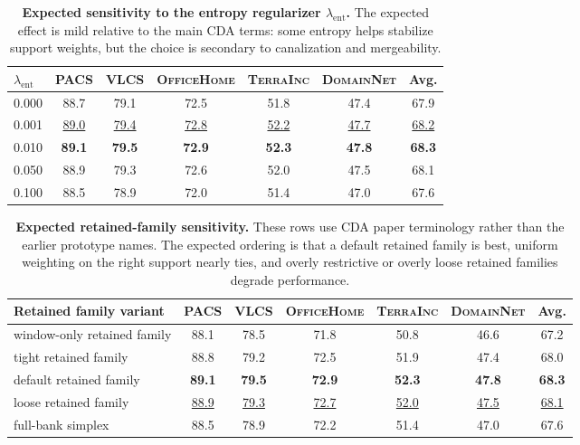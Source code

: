 \documentclass[10pt]{article}
\newcommand{\data}[1]{\textsc{#1}}
\newcommand{\Expected}[1]{#1}
\newcommand{\Best}[1]{\textbf{\Expected{#1}}}
\newcommand{\Second}[1]{\underline{\Expected{#1}}}
\begin{document}
\begin{table}[H]
\centering
\small
\caption{\textbf{Expected sensitivity to the entropy regularizer \(\lambda_{\mathrm{ent}}\).} The expected effect is mild relative to the main CDA terms: some entropy helps stabilize support weights, but the choice is secondary to canalization and mergeability.}
\label{tab:cda_lambda_ent_expected}
\setlength{\tabcolsep}{5pt}
\begin{tabular}{lccccc|c}
\toprule
\(\lambda_{\mathrm{ent}}\) & \data{PACS} & \data{VLCS} & \data{OfficeHome} & \data{TerraInc} & \data{DomainNet} & \textbf{Avg.} \\
\midrule
\Expected{0.000} & \Expected{88.7} & \Expected{79.1} & \Expected{72.5} & \Expected{51.8} & \Expected{47.4} & \Expected{67.9} \\
\Expected{0.001} & \Second{89.0} & \Second{79.4} & \Second{72.8} & \Second{52.2} & \Second{47.7} & \Second{68.2} \\
\Expected{0.010} & \Best{89.1} & \Best{79.5} & \Best{72.9} & \Best{52.3} & \Best{47.8} & \Best{68.3} \\
\Expected{0.050} & \Expected{88.9} & \Expected{79.3} & \Expected{72.6} & \Expected{52.0} & \Expected{47.5} & \Expected{68.1} \\
\Expected{0.100} & \Expected{88.5} & \Expected{78.9} & \Expected{72.0} & \Expected{51.4} & \Expected{47.0} & \Expected{67.6} \\
\bottomrule
\end{tabular}
\end{table}

\begin{table}[H]
\centering
\small
\caption{\textbf{Expected retained-family sensitivity.} These rows use CDA paper terminology rather than the earlier prototype names. The expected ordering is that a default retained family is best, uniform weighting on the right support nearly ties, and overly restrictive or overly loose retained families degrade performance.}
\label{tab:cda_family_sensitivity_expected}
\setlength{\tabcolsep}{5pt}
\begin{tabular}{lccccc|c}
\toprule
\textbf{Retained family variant} & \data{PACS} & \data{VLCS} & \data{OfficeHome} & \data{TerraInc} & \data{DomainNet} & \textbf{Avg.} \\
\midrule
window-only retained family & \Expected{88.1} & \Expected{78.5} & \Expected{71.8} & \Expected{50.8} & \Expected{46.6} & \Expected{67.2} \\
tight retained family & \Expected{88.8} & \Expected{79.2} & \Expected{72.5} & \Expected{51.9} & \Expected{47.4} & \Expected{68.0} \\
default retained family & \Best{89.1} & \Best{79.5} & \Best{72.9} & \Best{52.3} & \Best{47.8} & \Best{68.3} \\
loose retained family & \Second{88.9} & \Second{79.3} & \Second{72.7} & \Second{52.0} & \Second{47.5} & \Second{68.1} \\
full-bank simplex & \Expected{88.5} & \Expected{78.9} & \Expected{72.2} & \Expected{51.4} & \Expected{47.0} & \Expected{67.6} \\
\bottomrule
\end{tabular}
\end{table}
\end{document}
